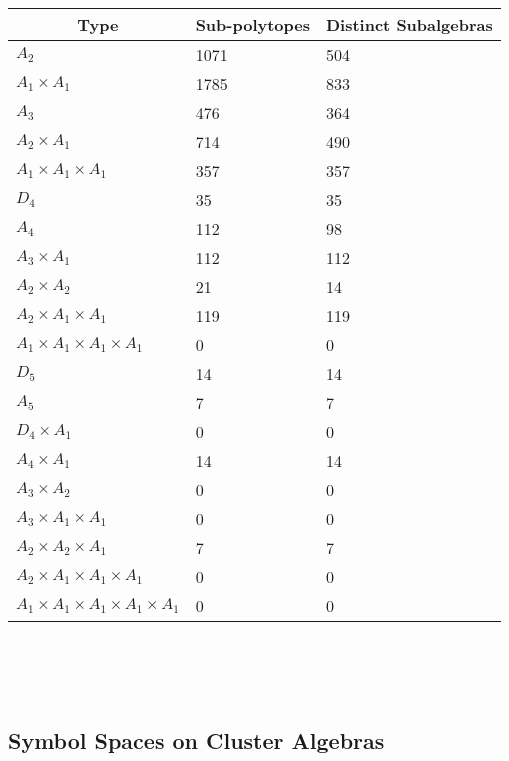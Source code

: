 \documentclass[12pt]{article}
\begin{document}
\begin{tabular}{ | l | l | l |}
\multicolumn{1}{c}{Type} &  \multicolumn{1}{c}{Sub-polytopes}  &  \multicolumn{1}{c}{Distinct Subalgebras} \\
\hline \(A_2\) & 1071 & 504 \\ 
\hline \(A_1 \times A_1\) & 1785 & 833 \\ \hline 
\hline \(A_3\) & 476 & 364 \\ 
\hline \(A_2 \times A_1\) & 714 & 490 \\ 
\hline \(A_1 \times A_1 \times A_1\) & 357 & 357 \\ \hline 
\hline \(D_4\) & 35 & 35 \\ 
\hline \(A_4\) & 112 & 98 \\ 
\hline \(A_3 \times A_1\) & 112 & 112 \\ 
\hline \(A_2 \times A_2\) & 21 & 14 \\ 
\hline \(A_2 \times A_1 \times A_1\) & 119 & 119 \\ 
\hline \(A_1 \times A_1 \times A_1 \times A_1\) & 0 & 0 \\ \hline 
\hline \(D_5\) & 14 & 14 \\ 
\hline \(A_5\) & 7 & 7 \\ 
\hline \(D_4 \times A_1\) & 0 & 0 \\ 
\hline \(A_4 \times A_1\) & 14 & 14 \\ 
\hline \(A_3 \times A_2\) & 0 & 0 \\ 
\hline \(A_3 \times A_1 \times A_1\) & 0 & 0 \\ 
\hline \(A_2 \times A_2 \times A_1\) & 7 & 7 \\ 
\hline \(A_2 \times A_1 \times A_1 \times A_1\) & 0 & 0 \\ 
\hline \(A_1 \times A_1 \times A_1 \times A_1 \times A_1\) & 0 & 0 \\ 
\hline
\end{tabular} \\ \\ \\


\newpage
\subsection*{Symbol Spaces on Cluster Algebras}
\end{document}
